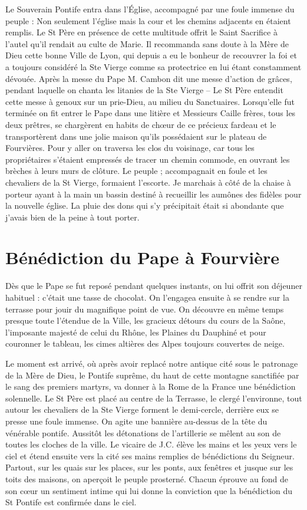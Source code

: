 \documentclass[11pt,a4paper]{report}
\begin{document}
Le Souverain Pontife entra dans l'Église, accompagné par une foule immense du peuple : Non seulement l'église mais la cour et les chemins adjacents en étaient remplis. Le St Père en présence de cette multitude offrit le Saint Sacrifice à l'autel qu'il rendait au culte de Marie. Il recommanda sans doute à la Mère de Dieu cette bonne Ville de Lyon, qui depuis a eu le bonheur de recouvrer la foi et a toujours considéré la Ste Vierge comme sa protectrice en lui étant constamment dévouée. Après la messe du Pape M. Cambon dit une messe d'action de grâces, pendant laquelle on chanta les litanies de la Ste Vierge -- Le St Père entendit cette messe à genoux sur un prie-Dieu, au milieu du Sanctuaires. Lorsqu'elle fut terminée on fit entrer le Pape dans une litière et Messieurs Caille frères, tous les deux prêtres, se chargèrent en habits de chœur de ce précieux fardeau et le transportèrent dans une jolie maison qu'ils possédaient sur le plateau de Fourvières. Pour y aller on traversa les clos du voisinage, car tous les propriétaires s'étaient empressés de tracer un chemin commode, en ouvrant les brèches à leurs murs de clôture. Le peuple ; accompagnait en foule et les chevaliers de la St Vierge, formaient l'escorte. Je marchais à côté de la chaise à porteur ayant à la main un bassin destiné à recueillir les aumônes des fidèles pour la nouvelle église. La pluie des dons qui s'y précipitait était si abondante que j'avais bien de la peine à tout porter.

\section*{Bénédiction du Pape à Fourvière}

Dès que le Pape se fut reposé pendant quelques instants, on lui offrit son déjeuner habituel : c'était une tasse de chocolat. On l'engagea ensuite à se rendre sur la terrasse pour jouir du magnifique point de vue. On découvre en même temps presque toute l'étendue de la Ville, les gracieux détours du cours de la Saône, l'imposante majesté de celui du Rhône, les Plaines du Dauphiné et pour couronner le tableau, les cimes altières des Alpes toujours couvertes de neige.

Le moment est arrivé, où après avoir replacé notre antique cité sous le patronage de la Mère de Dieu, le Pontife suprême, du haut de cette montagne sanctifiée par le sang des premiers martyrs, va donner à la Rome de la France une bénédiction solennelle. Le St Père est placé au centre de la Terrasse, le clergé l'environne, tout autour les chevaliers de la Ste Vierge forment le demi-cercle, derrière eux se presse une foule immense. On agite une bannière au-dessus de la tête du vénérable pontife. Aussitôt les détonations de l'artillerie se mêlent au son de toutes les cloches de la ville. Le vicaire de J.C. élève les mains et les yeux vers le ciel et étend ensuite vers la cité ses mains remplies de bénédictions du Seigneur. Partout, sur les quais sur les places, sur les ponts, aux fenêtres et jusque sur les toits des maisons, on aperçoit le peuple prosterné. Chacun éprouve au fond de son cœur un sentiment intime qui lui donne la conviction que la bénédiction du St Pontife est confirmée dans le ciel.
\end{document}
